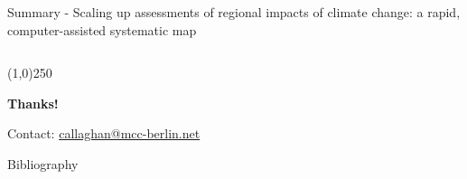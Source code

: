 \documentclass[9pt]{beamer}
\begin{document}
\begin{frame}{Summary - Scaling up assessments of regional impacts of climate change: a rapid, computer-assisted systematic map}
\begin{columns}
\begin{column}{0.5\linewidth}
	\end{column}
\end{columns}



\begin{center}
	\line(1,0){250}
	
	\medskip
	
	\textbf{Thanks!}
	
	\medskip
	
	Contact: \url{callaghan@mcc-berlin.net}

\end{center}



\end{frame}

\begin{frame}{Bibliography}

\end{frame}
\end{document}
